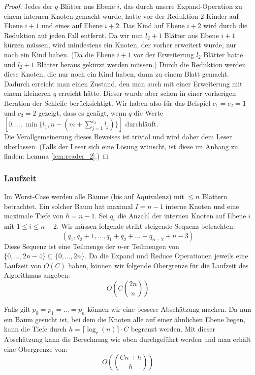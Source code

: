 \documentclass[a4paper,10pt,ngerman]{scrartcl}
\begin{document}
\begin{proof}
        Jedes der $q$ Blätter aus Ebene $i$, das durch unsere Expand-Operation zu einem internen Knoten gemacht wurde, hatte vor der Reduktion $2$ Kinder auf Ebene $i + 1$ und eines auf Ebene $i + 2$.
        Das Kind auf Ebene $i + 2$ wird durch die Reduktion auf jeden Fall entfernt.
        Da wir nun $l_2 + 1$ Blätter aus Ebene $i + 1$ kürzen müssen, wird mindestens ein Knoten, der vorher erweitert wurde, nur noch ein Kind haben. (Da die Ebene $i + 1$ vor der Erweiterung $l_2$ Blätter hatte und $l_2 + 1$ Blätter heraus gekürzt werden müssen.)
        Durch die Reduktion werden diese Knoten, die nur noch ein Kind haben, dann zu einem Blatt gemacht.
        Dadurch erreicht man einen Zustand, den man auch mit einer Erweiterung mit einem kleineren $q$ erreicht hätte.
        Dieser wurde aber schon in einer vorherigen Iteration der Schleife berücksichtigt.
        Wir haben also für das Beispiel $c_1 = c_2 = 1$ und $c_3 = 2$ gezeigt, dass es genügt, wenn $q$ die Werte $[0, \dots, \min\{l_1, n - (m + \sum^{c_2}_{j=1} l_j)\}]$ durchläuft.\\
        Die Verallgemeinerung dieses Beweises ist trivial und wird daher dem Leser überlassen.
        (Falls der Leser sich eine Lösung wünscht, ist diese im Anhang zu finden: Lemma \ref{lem:reader_2}.)
    \end{proof}

    \subsubsection{Laufzeit}
    Im Worst-Case werden alle Bäume (bis auf Äquivalenz) mit $\le n$ Blättern betrachtet.
    Ein solcher Baum hat maximal $I = n - 1$ interne Knoten und eine maximale Tiefe von $h = n - 1$.
    Sei $q_i$ die Anzahl der internen Knoten auf Ebene $i$ mit $1 \le i \le n - 2$.
    Wir müssen folgende strikt steigende Sequenz betrachten:
    \[(q_1, q_2 + 1, \dots, q_1 + q_2 + \dots + q_{n - 2} + n - 3)\]
    Diese Sequenz ist eine Teilmenge der $n$-er Teilmengen von $\{0, \dots, 2n - 4\} \subseteq \{0, \dots, 2n\}$.
    Da die Expand und Reduce Operationen jeweils eine Laufzeit von $O(C)$ haben, können wir folgende Obergrenze für die Laufzeit des Algorithmus angeben:
    \[O\left(C{{2n} \choose n}  \right)\]

    Falls gilt $p_0 = p_1 = \dots = p_n$ können wir eine bessere Abschätzung machen.
    Da nun ein Baum gesucht ist, bei dem die Knoten alle auf einer ähnlichen Ebene liegen, kann die Tiefe durch $h = \lceil \log_r(n) \rceil \cdot C$
    begrenzt werden.
    Mit dieser Abschätzung kann die Berechnung wie oben durchgeführt werden und man erhält eine Obergrenze von:
    \[O\left(C{n + h} \choose h \right)\]
\end{document}
